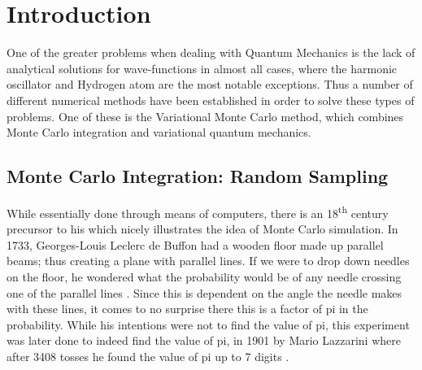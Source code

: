 

\section{Introduction}
One of the greater problems when dealing with Quantum Mechanics is the lack of analytical solutions for wave-functions
in almost all cases, where the harmonic oscillator and Hydrogen atom are the most notable exceptions.
Thus a number of different numerical methods have been established in order to solve these types
of problems. One of these is the Variational Monte Carlo method, which combines Monte Carlo integration and variational
quantum mechanics.


\subsection{Monte Carlo Integration: Random Sampling}
\label{ch:monte}
While essentially done through means of computers, there is an 18\textsuperscript{th} century precursor to
his which nicely illustrates the idea of Monte Carlo simulation. In 1733, Georges-Louis Leclerc
de Buffon had a wooden floor made up parallel beams; thus creating a plane with parallel lines.
If we were to drop down needles on the floor, he wondered what the probability would be of
any needle crossing one of the parallel lines \cite{Buffon}. Since this is dependent on the
angle the needle makes with these lines, it comes to no surprise there this is a factor of pi
in the probability. While his intentions were not to find the value of pi, this experiment
was later done to indeed find the value of pi, in 1901 by Mario Lazzarini where after 3408
tosses he found the value of pi up to 7 digits \cite{Lazzarini}.



